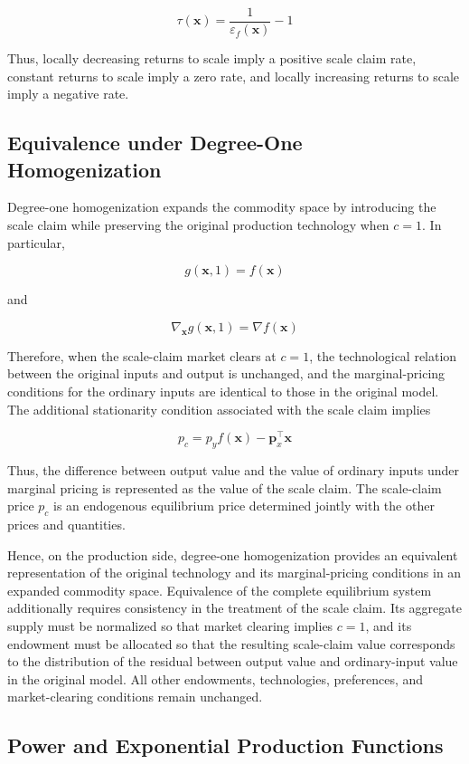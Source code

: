 \documentclass[
  letterpaper,
  DIV=11,
  numbers=noendperiod]{scrreprt}
\begin{document}
\[
\tau(\mathbf x)
=
\frac{1}{\varepsilon_f(\mathbf x)}-1
\]

Thus, locally decreasing returns to scale imply a positive scale claim
rate, constant returns to scale imply a zero rate, and locally
increasing returns to scale imply a negative rate.

\subsection{Equivalence under Degree-One
Homogenization}\label{equivalence-under-degree-one-homogenization}

Degree-one homogenization expands the commodity space by introducing the
scale claim while preserving the original production technology when
\(c=1\). In particular,

\[
g(\mathbf x,1)=f(\mathbf x)
\]

and

\[
\nabla_{\mathbf x}g(\mathbf x,1)
=
\nabla f(\mathbf x)
\]

Therefore, when the scale-claim market clears at \(c=1\), the
technological relation between the original inputs and output is
unchanged, and the marginal-pricing conditions for the ordinary inputs
are identical to those in the original model. The additional
stationarity condition associated with the scale claim implies

\[
p_c
=
p_yf(\mathbf x)
-
\mathbf p_x^\top\mathbf x
\]

Thus, the difference between output value and the value of ordinary
inputs under marginal pricing is represented as the value of the scale
claim. The scale-claim price \(p_c\) is an endogenous equilibrium price
determined jointly with the other prices and quantities.

Hence, on the production side, degree-one homogenization provides an
equivalent representation of the original technology and its
marginal-pricing conditions in an expanded commodity space. Equivalence
of the complete equilibrium system additionally requires consistency in
the treatment of the scale claim. Its aggregate supply must be
normalized so that market clearing implies \(c=1\), and its endowment
must be allocated so that the resulting scale-claim value corresponds to
the distribution of the residual between output value and ordinary-input
value in the original model. All other endowments, technologies,
preferences, and market-clearing conditions remain unchanged.

\subsection{Power and Exponential Production
Functions}\label{power-and-exponential-production-functions}
\end{document}
